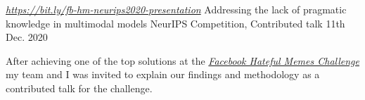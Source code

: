 \newpage
{}

\begin{cventries}

  \cventry
    {\href{https://bit.ly/fb-hm-neurips2020-presentation}{\textit{https://bit.ly/fb-hm-neurips2020-presentation}}} %
    {Addressing the lack of pragmatic knowledge in multimodal models} %
    {NeurIPS Competition, Contributed talk} %
    {11th Dec. 2020} %
    {
      \begin{cvitems} %
        \item After achieving one of the top solutions at the \href{https://ai.facebook.com/blog/hateful-memes-challenge-and-data-set/}{\textit{Facebook Hateful Memes Challenge}} my team and I was invited to explain our findings and methodology as a contributed talk for the challenge.
      \end{cvitems}
    }

\end{cventries}
